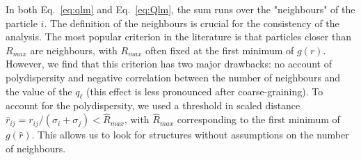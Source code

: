 \documentclass{revtex4-1}
\begin{document}
In both Eq.~\ref{eq:qlm} and Eq.~\ref{eq:Qlm}, the sum runs over the "neighbours" of the particle $i$. The definition of the neighbours is crucial for the consistency of the analysis. The most popular criterion in the literature is that particles closer than $R_{max}$ are neighbours, with $R_{max}$ often fixed at the first minimum of $g(r)$. However, we find that this criterion has two major drawbacks: no account of polydispersity and negative correlation between the number of neighbours and the value of the $q_\ell$ (this effect is less pronounced after coarse-graining). To account for the polydispersity, we used a threshold in scaled distance $\hat{r}_{i j} = r_{i j} /(\sigma_i+\sigma_j) < \hat{R}_{max}$, with $\hat{R}_{max}$ corresponding to the first minimum of $g(\hat{r})$. This allows us to look for structures without assumptions on the number of neighbours.
\end{document}
